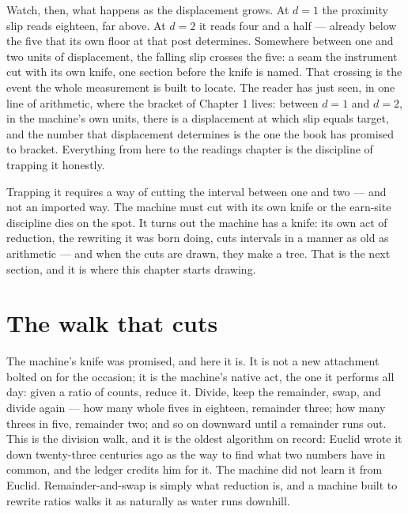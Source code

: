 Watch, then, what happens as the displacement grows. At $d = 1$ the proximity slip
reads eighteen, far above. At $d = 2$ it reads four and a half --- already below the
five that its own floor at that post determines. Somewhere between one and two units
of displacement, the falling slip crosses the five: a seam the instrument cut with its
own knife, one section before the knife is named. That crossing is the event the whole
measurement is built to locate. The reader has just
seen, in one line of arithmetic, where the bracket of Chapter 1 lives: between $d = 1$
and $d = 2$, in the machine's own units, there is a displacement at which slip equals
target, and the number that displacement determines is the one the book has promised
to bracket. Everything from here to the readings chapter is the discipline of trapping
it honestly.

Trapping it requires a way of cutting the interval between one and two --- and not an
imported way. The machine must cut with its own knife or the earn-site discipline dies
on the spot. It turns out the machine has a knife: its own act of reduction, the
rewriting it was born doing, cuts intervals in a manner as old as arithmetic --- and
when the cuts are drawn, they make a tree. That is the next section, and it is where
this chapter starts drawing.

\section{The walk that cuts}

The machine's knife was promised, and here it is. It is not a new attachment bolted on
for the occasion; it is the machine's native act, the one it performs all day: given a
ratio of counts, reduce it. Divide, keep the remainder, swap, and divide again --- how
many whole fives in eighteen, remainder three; how many threes in five, remainder two;
and so on downward until a remainder runs out. This is the division walk, and it is
the oldest algorithm on record: Euclid wrote it down twenty-three centuries ago as the
way to find what two numbers have in common, and the ledger credits him for it. The
machine did not learn it from Euclid. Remainder-and-swap is simply what reduction is,
and a machine built to rewrite ratios walks it as naturally as water runs downhill.

